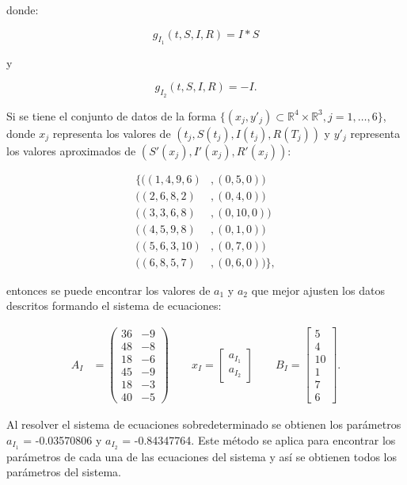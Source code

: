 donde:

$$g_{I_1}(t,S,I,R) = I*S$$

y

$$g_{I_2}(t,S,I,R) = -I.$$

Si se tiene el conjunto de datos de la forma $\{(x_j, y'_j) \subset \mathbb{R}^{4} \times \mathbb{R}^3, j = 1, \dots, 6\}$, donde $x_j$ representa los valores de $(t_j, S(t_j), I(t_j), R(T_j))$ y $y'_j$ representa los valores aproximados de $(S'(x_j), I'(x_j), R'(x_j))$:

\begin{align*}
    \{ ((1, 4, 9, 6) & ,  (0, 5, 0))     \\
    ((2, 6, 8, 2)    & ,  (0, 4, 0))     \\
    ((3, 3, 6, 8)    & ,  (0, 10, 0))    \\
    ((4, 5, 9, 8)    & ,  (0, 1, 0))     \\
    ((5, 6, 3, 10)   & , (0, 7, 0))      \\
    ((6, 8, 5, 7)    & ,  (0, 6, 0)) \},
\end{align*}

entonces se puede encontrar los valores de $a_1$ y $a_2$ que mejor ajusten los datos descritos formando el sistema de ecuaciones:

\begin{align*}
    A_I & = \begin{pmatrix}
        36 & -9 \\
        48 & -8 \\
        18 & -6 \\
        45 & -9 \\
        18 & -3 \\
        40 & -5
    \end{pmatrix}
    \qquad
    x_I = \begin{bmatrix}
        a_{I_1} \\
        a_{I_2}
    \end{bmatrix}
    \qquad
    B_I = \begin{bmatrix}
        5  \\
        4  \\
        10 \\
        1  \\
        7  \\
        6
    \end{bmatrix}.
\end{align*}

Al resolver el sistema de ecuaciones sobredeterminado se obtienen los parámetros $a_{I_1}$ = -0.03570806 y $a_{I_2}$ = -0.84347764. Este método se aplica para encontrar los parámetros de cada una de las ecuaciones del sistema y así se obtienen todos los parámetros del sistema.

